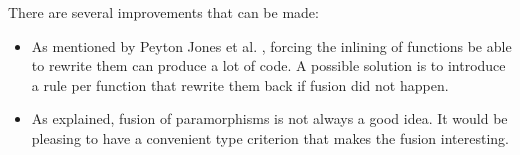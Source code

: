 
There are several improvements that can be made:
\begin{itemize}
\item As mentioned by Peyton Jones et al. \cite{pbr}, forcing the inlining of functions be able to rewrite them can produce a lot of code. A possible solution is to introduce a rule per function that rewrite them back if fusion did not happen.
\item As explained, fusion of paramorphisms is not always a good idea. It would be pleasing to have a convenient type criterion that makes the fusion interesting.
\end{itemize}